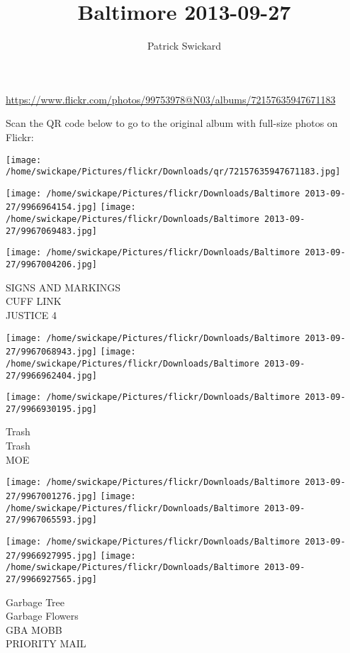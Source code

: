 \documentclass[10pt,letterpaper]{article}
\title{Baltimore 2013-09-27}
\author{Patrick Swickard}
\date{}
\begin{document}
\maketitle

\url{https://www.flickr.com/photos/99753978@N03/albums/72157635947671183}

Scan the QR code below to go to the original album with full-size photos on Flickr:

\texttt{[image: /home/swickape/Pictures/flickr/Downloads/qr/72157635947671183.jpg]}
\pagebreak

\texttt{[image: /home/swickape/Pictures/flickr/Downloads/Baltimore 2013-09-27/9966964154.jpg]}
\texttt{[image: /home/swickape/Pictures/flickr/Downloads/Baltimore 2013-09-27/9967069483.jpg]}

\vspace{0.25in}
\texttt{[image: /home/swickape/Pictures/flickr/Downloads/Baltimore 2013-09-27/9967004206.jpg]}

SIGNS AND MARKINGS\\
CUFF LINK\\
JUSTICE 4
\pagebreak

\texttt{[image: /home/swickape/Pictures/flickr/Downloads/Baltimore 2013-09-27/9967068943.jpg]}
\texttt{[image: /home/swickape/Pictures/flickr/Downloads/Baltimore 2013-09-27/9966962404.jpg]}

\vspace{0.25in}
\texttt{[image: /home/swickape/Pictures/flickr/Downloads/Baltimore 2013-09-27/9966930195.jpg]}

Trash\\
Trash\\
MOE
\pagebreak

\texttt{[image: /home/swickape/Pictures/flickr/Downloads/Baltimore 2013-09-27/9967001276.jpg]}
\texttt{[image: /home/swickape/Pictures/flickr/Downloads/Baltimore 2013-09-27/9967065593.jpg]}

\texttt{[image: /home/swickape/Pictures/flickr/Downloads/Baltimore 2013-09-27/9966927995.jpg]}
\texttt{[image: /home/swickape/Pictures/flickr/Downloads/Baltimore 2013-09-27/9966927565.jpg]}

Garbage Tree\\
Garbage Flowers\\
GBA MOBB\\
PRIORITY MAIL
\pagebreak
\end{document}
